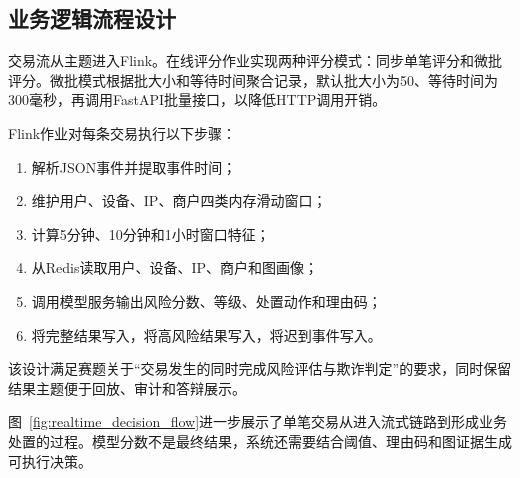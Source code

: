 \subsection{业务逻辑流程设计}

交易流从主题进入Flink。在线评分作业实现两种评分模式：同步单笔评分和微批评分。微批模式根据批大小和等待时间聚合记录，默认批大小为50、等待时间为300毫秒，再调用FastAPI批量接口，以降低HTTP调用开销。

Flink作业对每条交易执行以下步骤：

\begin{enumerate}
  \item 解析JSON事件并提取事件时间；
  \item 维护用户、设备、IP、商户四类内存滑动窗口；
  \item 计算5分钟、10分钟和1小时窗口特征；
  \item 从Redis读取用户、设备、IP、商户和图画像；
  \item 调用模型服务输出风险分数、等级、处置动作和理由码；
  \item 将完整结果写入，将高风险结果写入，将迟到事件写入。
\end{enumerate}

该设计满足赛题关于“交易发生的同时完成风险评估与欺诈判定”的要求，同时保留结果主题便于回放、审计和答辩展示。

图~\ref{fig:realtime_decision_flow}进一步展示了单笔交易从进入流式链路到形成业务处置的过程。模型分数不是最终结果，系统还需要结合阈值、理由码和图证据生成可执行决策。

